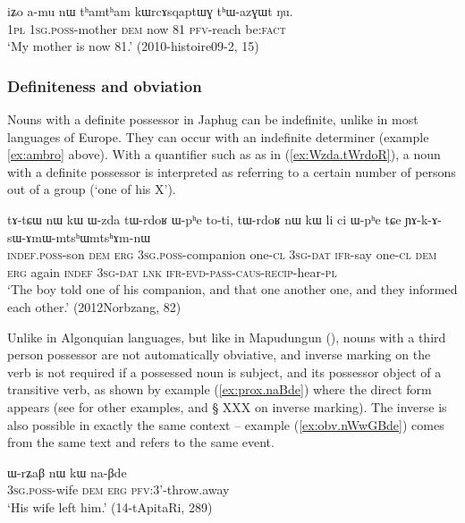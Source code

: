 \begin{exe}
\ex \label{ex:iZo.amu}
\gll iʑo a-mu nɯ tʰamtʰam kɯrcɤsqaptɯɣ tʰɯ-azɣɯt ŋu. \\
\textsc{1pl} \textsc{1sg.poss}-mother \textsc{dem} now 81 \textsc{pfv}-reach  be:\textsc{fact} \\
\glt `My mother is now 81.' (2010-histoire09-2, 15)
\end{exe}

\subsubsection{Definiteness and obviation}
Nouns with a definite possessor in Japhug can be indefinite, unlike in most languages of Europe. They can occur with an indefinite determiner (example \ref{ex:ambro}  above). With a quantifier such as  as in (\ref{ex:Wzda.tWrdoR}), a noun with a definite possessor is interpreted as referring to a certain number of persons out of a group (`one of his X').

 \begin{exe}
\ex \label{ex:Wzda.tWrdoR}
\gll tɤ-tɕɯ nɯ kɯ ɯ-zda tɯ-rdoʁ ɯ-pʰe to-ti, tɯ-rdoʁ nɯ kɯ li ci ɯ-pʰe tɕe ɲɤ-k-ɤ-sɯ-ɤmɯ-mtsʰɯ\redp{}mtsʰɤm-nɯ \\
\textsc{indef.poss}-son \textsc{dem} \textsc{erg} \textsc{3sg.poss}-companion one-\textsc{cl} \textsc{3sg-dat} \textsc{ifr}-say one-\textsc{cl}  \textsc{dem} \textsc{erg} again \textsc{indef} \textsc{3sg-dat} \textsc{lnk}   \textsc{ifr}-\textsc{evd}-\textsc{pass}-\textsc{caus}-\textsc{recip}-hear-\textsc{pl} \\
\glt `The boy told one of his companion, and that one another one, and they informed each other.' (2012Norbzang, 82)
\end{exe}

Unlike in Algonquian languages, but like in Mapudungun (\citealt{haude16symmetrical}), nouns with a third person possessor are not automatically obviative, and inverse marking on the verb is not required if a possessed noun is subject, and its possessor object of a transitive verb, as shown by example (\ref{ex:prox.naBde}) where the direct form  appears (see \citealt{jacques10inverse} for other examples, and § XXX on inverse marking). The inverse  is also possible in exactly the same context -- example  (\ref{ex:obv.nWwGBde}) comes from the same text and refers to the same event.

\begin{exe}
\ex \label{ex:prox.naBde}
\gll ɯ-rʑaβ nɯ kɯ na-βde \\
\textsc{3sg.poss}-wife \textsc{dem} \textsc{erg} \textsc{pfv}:3'-throw.away \\
\glt `His wife left him.' (14-tApitaRi, 289)
\end{exe}

